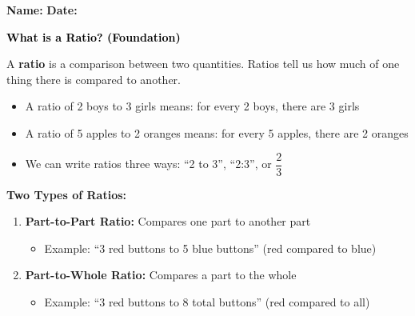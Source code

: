 \documentclass[12pt, letterpaper, fleqn]{article}
\begin{document}
\textbf{Name:} \underline{\hspace{5cm}}
\hfill
\textbf{Date:} \underline{\hspace{3cm}}\\

\begin{tcolorbox}[colback=customteal!20]
    \large\textcolor{black}{\textbf{What is a Ratio? (Foundation)}}
\end{tcolorbox}

\vspace{3mm}

\noindent
A \textbf{ratio} is a comparison between two quantities. Ratios tell us how much of one thing there is compared to another.

\begin{itemize}
    \item A ratio of 2 boys to 3 girls means: for every 2 boys, there are 3 girls
    \item A ratio of 5 apples to 2 oranges means: for every 5 apples, there are 2 oranges
    \item We can write ratios three ways: ``2 to 3'', ``2:3'', or $\dfrac{2}{3}$
\end{itemize}

\medskip

\noindent
\textbf{Two Types of Ratios:}
\begin{enumerate}
    \item \textbf{Part-to-Part Ratio:} Compares one part to another part
    \begin{itemize}
        \item Example: ``3 red buttons to 5 blue buttons'' (red compared to blue)
    \end{itemize}
    
    \item \textbf{Part-to-Whole Ratio:} Compares a part to the whole
    \begin{itemize}
        \item Example: ``3 red buttons to 8 total buttons'' (red compared to all)
    \end{itemize}
\end{enumerate}

\vspace{4mm}
\end{document}

